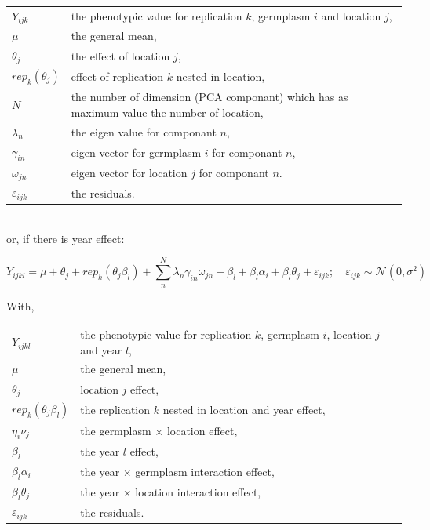 \documentclass{book}\usepackage[]{graphicx}\usepackage[]{color}
\begin{document}
\begin{tabular}{ll}
$Y_{ijk}$ & the phenotypic value for replication $k$, germplasm $i$ and location $j$,\\
$\mu$ & the general mean,\\
$\theta_{j}$ & the effect of location $j$,\\
$rep_{k}(\theta_{j})$ & effect of replication $k$ nested in location,\\
$N$ & the number of dimension (PCA componant) which has as maximum value the number of location,\\
$\lambda_{n}$ & the eigen value for componant $n$,\\
$\gamma_{in}$ & eigen vector for germplasm $i$ for componant $n$,\\
$\omega_{jn}$ & eigen vector for  location $j$  for componant $n$.\\
$\varepsilon_{ijk}$ & the residuals.\\
\end{tabular}

~\\

or, if there is year effect:


\begin{equation}
Y_{ijkl} = \mu + \theta_{j} + rep_{k}(\theta_{j}\beta_{l}) +\sum_{n}^{N} \lambda_{n} \gamma_{in} \omega_{jn} + 
\beta_{l} + \beta_{l}\alpha_{i} + \beta_{l}\theta_{j} + 
\varepsilon_{ijk}; \quad \varepsilon_{ijk} \sim \mathcal{N} (0,\sigma^2)
\label{ammi_anova}
\end{equation}

With,

\begin{tabular}{ll}
$Y_{ijkl}$ & the phenotypic value for replication $k$, germplasm $i$, location $j$ and year $l$, \\
$\mu$ & the general mean, \\
$\theta_{j}$ & location $j$ effect, \\
$rep_{k}(\theta_{j}\beta_{l})$ & the replication $k$ nested in location and year effect, \\
$\eta_{i}\nu_{j}$ & the germplasm $\times$ location effect, \\
$\beta_{l}$ & the year $l$ effect, \\
$\beta_{l}\alpha_{i}$ & the year $\times$ germplasm interaction effect, \\
$\beta_{l}\theta_{j}$ & the year $\times$ location interaction effect, \\
$\varepsilon_{ijk}$ & the residuals.\\
\end{tabular}
\end{document}
